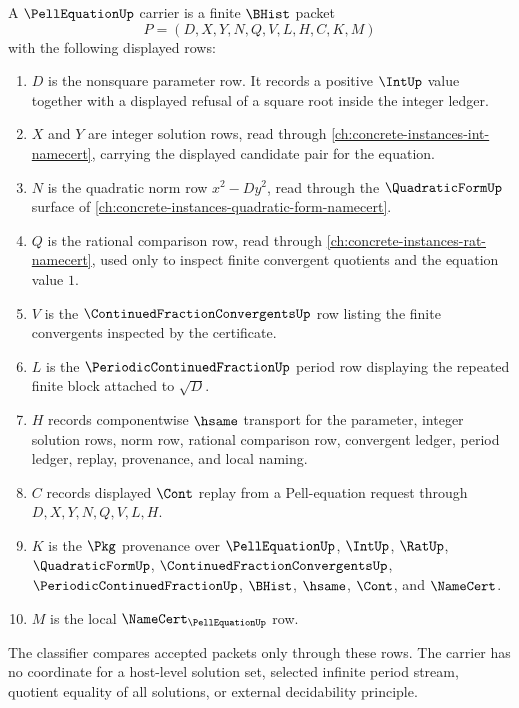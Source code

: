 \begin{definition}
\label{def:pell-equation-carrier}
A $\PellEquationUp$ carrier is a finite $\BHist$ packet
$$
P=(D,X,Y,N,Q,V,L,H,C,K,M)
$$
with the following displayed rows:
\begin{enumerate}
\item $D$ is the nonsquare parameter row. It records a positive $\IntUp$ value together with a displayed refusal of a square root inside the integer ledger.
\item $X$ and $Y$ are integer solution rows, read through \autoref{ch:concrete-instances-int-namecert}, carrying the displayed candidate pair for the equation.
\item $N$ is the quadratic norm row $x^2-Dy^2$, read through the $\QuadraticFormUp$ surface of \autoref{ch:concrete-instances-quadratic-form-namecert}.
\item $Q$ is the rational comparison row, read through \autoref{ch:concrete-instances-rat-namecert}, used only to inspect finite convergent quotients and the equation value $1$.
\item $V$ is the $\ContinuedFractionConvergentsUp$ row listing the finite convergents inspected by the certificate.
\item $L$ is the $\PeriodicContinuedFractionUp$ period row displaying the repeated finite block attached to $\sqrt{D}$.
\item $H$ records componentwise $\hsame$ transport for the parameter, integer solution rows, norm row, rational comparison row, convergent ledger, period ledger, replay, provenance, and local naming.
\item $C$ records displayed $\Cont$ replay from a Pell-equation request through $D,X,Y,N,Q,V,L,H$.
\item $K$ is the $\Pkg$ provenance over $\PellEquationUp$, $\IntUp$, $\RatUp$, $\QuadraticFormUp$, $\ContinuedFractionConvergentsUp$, $\PeriodicContinuedFractionUp$, $\BHist$, $\hsame$, $\Cont$, and $\NameCert$.
\item $M$ is the local $\NameCert_{\PellEquationUp}$ row.
\end{enumerate}
The classifier compares accepted packets only through these rows. The carrier has no coordinate for a host-level solution set, selected infinite period stream, quotient equality of all solutions, or external decidability principle.
\end{definition}

